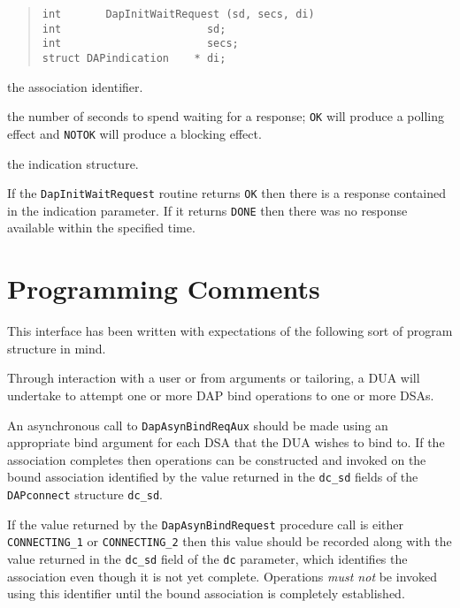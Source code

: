 \begin{quote}\small\begin{verbatim}
int       DapInitWaitRequest (sd, secs, di)
int                       sd;
int                       secs;
struct DAPindication    * di;
\end{verbatim}\end{quote}

\begin{describe}

\item [\verb"sd":]
the association identifier.

\item [\verb"secs":]
the number of seconds to spend waiting for a response; \verb"OK" will
produce a polling effect and \verb"NOTOK" will produce a blocking
effect.

\item [\verb"di":]
the indication structure.
\end{describe}

If the \verb"DapInitWaitRequest" routine returns \verb"OK" then there
is a response contained in the indication parameter.
If it returns \verb"DONE" then there was no response available within
the specified time.

\section {Programming Comments}

This interface has been written with expectations of the following
sort of program structure in mind.

Through interaction with a user or from arguments or tailoring, a
DUA will undertake to attempt one or more DAP bind operations to
one or more DSAs.

An asynchronous call to \verb"DapAsynBindReqAux" should be made using
an appropriate bind argument for each DSA that the DUA wishes to bind to.
If the association completes then operations can be constructed and
invoked on the bound association identified by the value returned in
the \verb"dc_sd" fields of the \verb"DAPconnect" structure \verb"dc_sd".

If the value returned by the \verb"DapAsynBindRequest" procedure call is
either 
\verb"CONNECTING_1" or \verb"CONNECTING_2" then this value should
be recorded along with the value returned in the \verb"dc_sd" field
of the \verb"dc" parameter, which identifies the association even
though it is not yet complete.
Operations {\em must not} be invoked using this identifier until the
bound association is completely established.

